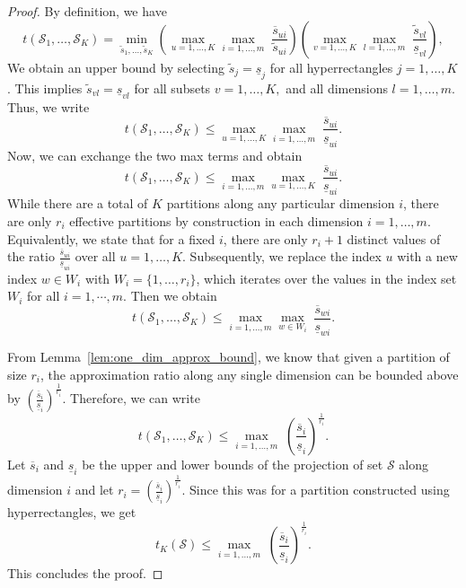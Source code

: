 \documentclass{article}
\newcommand{\mS}{\mathcal{S}}
\newcommand{\newscen}[1]{\tilde{s}_{#1}}%
\begin{document}
\begin{proof}
By definition, we have 
\[
	t(\mS_1,\dots,\mS_K) = \min_{\newscen{1},\dots,\newscen{K}}\left(\max_{u=1,\dots,K} \max_{i = 1,\dots,m}\;\frac{\overline{s}_{ui}}{\newscen{ui}}\right) \left(\max_{v=1,\dots,K} \max_{l=1,\dots,m}\;\frac{\newscen{vl}}{\underline{s}_{vl}}\right),
\]
We obtain an upper bound by selecting \(\newscen{j} = \underline{s}_j\) for all hyperrectangles \(j=1,\dots,K\). 
This implies \(\newscen{vl} = \underline{s}_{vl}\) for all subsets \(v = 1,\dots,K,\) and all dimensions \(l=1,\dots,m\).
Thus, we write 
\[
	t(\mS_1,\dots,\mS_K) \leq \max_{u=1,\dots,K} \max_{i = 1,\dots,m}\;\frac{\overline{s}_{ui}}{\underline{s}_{ui}}.
\]
Now, we can exchange the two max terms and obtain 
\[
	t(\mS_1,\dots,\mS_K) \leq \max_{i = 1,\dots,m} \max_{u=1,\dots,K}\;\frac{\overline{s}_{ui}}{\underline{s}_{ui}}.
\]
While there are a total of \(K\) partitions along any particular dimension \(i\), there are only \(r_i\) effective partitions by construction in each dimension $i=1,\ldots,m$.
Equivalently, we state that for a fixed \(i\), there are only \(r_i+1\) distinct values of the ratio \(\frac{\overline{s}_{ui}}{\underline{s}_{ui}}\) over all \(u=1,\dots,K\).
Subsequently, we replace the index \(u\) with a new index \(w \in W_i\) with \(W_i = \{1,\ldots,r_i\}\), which iterates over the values in the index set \( W_i\) for all $i=1,\cdots,m$.
Then we obtain
\[
	t(\mS_1,\dots,\mS_K) \leq \max_{i = 1,\dots,m} \max_{w \in W_i}\;\frac{\overline{s}_{wi}}{\underline{s}_{wi}}.
\]

From Lemma~\ref{lem:one_dim_approx_bound}, we know that given a partition of size \(r_i\), the approximation ratio along any single dimension can be bounded above by \(
	\left(\frac{\overline{s}_{i}}{\underline{s}_{i}}\right)^{\frac{1}{r_i}}\).
	Therefore, we can write 
	\[
		t(\mS_1,\dots,\mS_K) \leq \max_{i = 1,\dots,m} \;\left(\frac{\overline{s}_{i}}{\underline{s}_{i}}\right)^{\frac{1}{r_i}}.
	\]
Let \(\overline{s}_i\) and \(\underline{s}_i\) be the upper and lower bounds of the projection of set \(\mS\) along dimension \(i\) and let \(r_i = \left(\frac{\overline{s}_i}{\underline{s}_i}\right)^{\frac{1}{r_i}}\).
Since this was for a partition constructed using hyperrectangles, we get
\[
		t_K(\mS) \leq \max_{i = 1,\dots,m} \;\left(\frac{\overline{s}_{i}}{\underline{s}_{i}}\right)^{\frac{1}{r_i}}.
	\]
This concludes the proof.

\end{proof}
\end{document}

